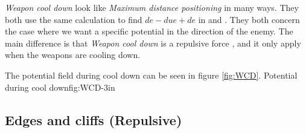 {	\textit{Weapon cool down} look like \textit{Maximum distance positioning} in many ways. They both use the same calculation to find $de - due + de$ in  and .
	They both concern the case where we want a specific potential in the direction of the enemy. The main difference is that \textit{Weapon cool down} is a repulsive force , and it only apply when the weapons are cooling down.
	
	The potential field during cool down can be seen in figure \ref{fig:WCD}.
			{Potential during cool down}{fig:WCD}{-3in}
	\subsection{Edges and cliffs (Repulsive)}}








